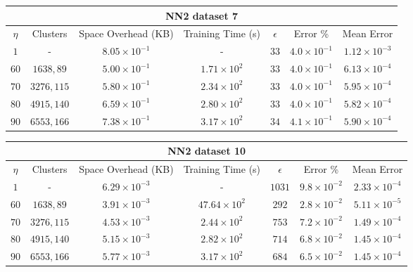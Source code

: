 \par\null\par
\par\null\par

\begin{adjustwidth}{-1cm}{}
\begin{tabular}{ccccccc}
\hline
\multicolumn{7}{c}{NN2 dataset 7} \\
\toprule
$\eta$ & Clusters & Space Overhead (KB) & Training Time (s) & $\epsilon$ & Error \% & Mean Error\\
\midrule
$1$ & - & $8.05 \times 10^{-1}$ & - & $33$ & $4.0 \times 10^{-1}$ & $1.12 \times 10^{-3}$\\
$60$ & $1638, 89$ & $5.00 \times 10^{-1}$ & $1.71 \times 10^2$ & $33$ & $4.0 \times 10^{-1}$ & $6.13 \times 10^{-4}$\\
$70$ & $3276, 115$ & $5.80 \times 10^{-1}$ & $2.34 \times 10^2$ & $33$ & $4.0 \times 10^{-1}$ & $5.95 \times 10^{-4}$\\
$80$ & $4915, 140$ & $6.59 \times 10^{-1}$ & $2.80 \times 10^2$ & $33$ & $4.0 \times 10^{-1}$ & $5.82 \times 10^{-4}$\\
$90$ & $6553, 166$ & $7.38 \times 10^{-1}$ & $3.17 \times 10^2$ & $34$ & $4.1 \times 10^{-1}$ & $5.90 \times 10^{-4}$\\
\bottomrule
\end{tabular}
\end{adjustwidth}

\par\null\par
\par\null\par

\begin{adjustwidth}{-1cm}{}
\begin{tabular}{ccccccc}
\hline
\multicolumn{7}{c}{NN2 dataset 10} \\
\toprule
$\eta$ & Clusters & Space Overhead (KB) & Training Time (s) & $\epsilon$ & Error \% & Mean Error\\
\midrule
$1$ & - & $6.29 \times 10^{-3}$ & - & $1031$ & $9.8 \times 10^{-2}$ & $2.33 \times 10^{-4}$\\
$60$ & $1638, 89$ & $3.91 \times 10^{-3}$ & $47.64 \times 10^2$ & $292$ & $2.8 \times 10^{-2}$ & $5.11 \times 10^{-5}$\\
$70$ & $3276, 115$ & $4.53 \times 10^{-3}$ & $2.44 \times 10^2$ & $753$ & $7.2 \times 10^{-2}$ & $1.49 \times 10^{-4}$\\
$80$ & $4915, 140$ & $5.15 \times 10^{-3}$ & $2.82 \times 10^2$ & $714$ & $6.8 \times 10^{-2}$ & $1.45 \times 10^{-4}$\\
$90$ & $6553, 166$ & $5.77 \times 10^{-3}$ & $3.17 \times 10^2$ & $684$ & $6.5 \times 10^{-2}$ & $1.45 \times 10^{-4}$\\
\bottomrule
\end{tabular}
\end{adjustwidth}

